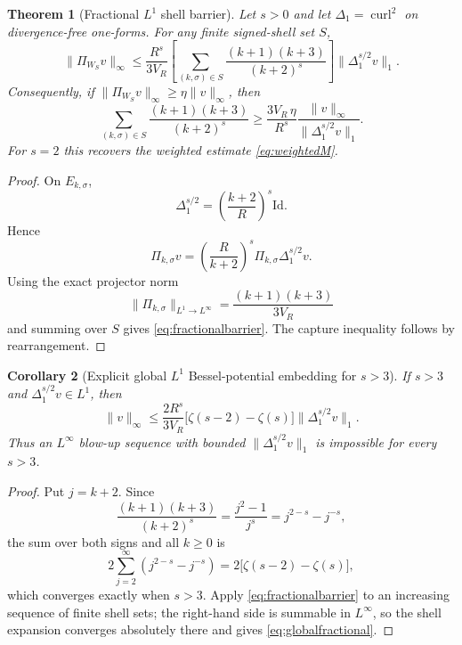 \documentclass[
 aps,
 prd,
 reprint,
 amsmath,
 amssymb,
 nofootinbib,
 superscriptaddress
]{revtex4-2}
\newtheorem{theorem}{Theorem}[section]
\newtheorem{corollary}[theorem]{Corollary}
\theoremstyle{definition}
\theoremstyle{remark}
\newcommand{\curl}{\operatorname{curl}}
\newcommand{\Id}{\mathrm{Id}}
\begin{document}
\begin{theorem}[Fractional $L^1$ shell barrier]
\label{thm:fractionalbarrier}
Let $s>0$ and let $\Delta_1=\curl^2$ on divergence-free one-forms.
For any finite signed-shell set $S$,
\begin{equation}
 \boxed{
 \|\Pi_{W_S}v\|_\infty
 \le
 \frac{R^s}{3V_R}
 \left[
   \sum_{(k,\sigma)\in S}
   \frac{(k+1)(k+3)}{(k+2)^s}
 \right]
 \|\Delta_1^{s/2}v\|_1.
 }
 \label{eq:fractionalbarrier}
\end{equation}
Consequently, if
$\|\Pi_{W_S}v\|_\infty\ge\eta\|v\|_\infty$, then
\begin{equation}
 \boxed{
 \sum_{(k,\sigma)\in S}
 \frac{(k+1)(k+3)}{(k+2)^s}
 \ge
 \frac{3V_R\,\eta}{R^s}
 \frac{\|v\|_\infty}{\|\Delta_1^{s/2}v\|_1}.
 }
 \label{eq:fractionalcapture}
\end{equation}
For $s=2$ this recovers the weighted estimate
\eqref{eq:weightedM}.
\end{theorem}

\begin{proof}
On $E_{k,\sigma}$,
\[
 \Delta_1^{s/2}
 =
 \left(\frac{k+2}{R}\right)^s\Id.
\]
Hence
\[
 \Pi_{k,\sigma}v
 =
 \left(\frac{R}{k+2}\right)^s
 \Pi_{k,\sigma}\Delta_1^{s/2}v.
\]
Using the exact projector norm
\[
 \|\Pi_{k,\sigma}\|_{L^1\to L^\infty}
 =
 \frac{(k+1)(k+3)}{3V_R}
\]
and summing over $S$ gives \eqref{eq:fractionalbarrier}.
The capture inequality follows by rearrangement.
\end{proof}

\begin{corollary}[Explicit global $L^1$ Bessel-potential embedding for $s>3$]
\label{cor:globalfractional}
If $s>3$ and $\Delta_1^{s/2}v\in L^1$, then
\begin{equation}
 \boxed{
 \|v\|_\infty
 \le
 \frac{2R^s}{3V_R}
 \bigl[\zeta(s-2)-\zeta(s)\bigr]
 \|\Delta_1^{s/2}v\|_1.
 }
 \label{eq:globalfractional}
\end{equation}
Thus an $L^\infty$ blow-up sequence with bounded
$\|\Delta_1^{s/2}v\|_1$ is impossible for every $s>3$.
\end{corollary}

\begin{proof}
Put $j=k+2$.  Since
\[
 \frac{(k+1)(k+3)}{(k+2)^s}
 =
 \frac{j^2-1}{j^s}
 =
 j^{2-s}-j^{-s},
\]
the sum over both signs and all $k\ge0$ is
\[
 2\sum_{j=2}^\infty(j^{2-s}-j^{-s})
 =
 2\bigl[\zeta(s-2)-\zeta(s)\bigr],
\]
which converges exactly when $s>3$.  Apply
\eqref{eq:fractionalbarrier} to an increasing sequence of finite shell sets;
the right-hand side is summable in $L^\infty$, so the shell expansion
converges absolutely there and gives \eqref{eq:globalfractional}.
\end{proof}
\end{document}
